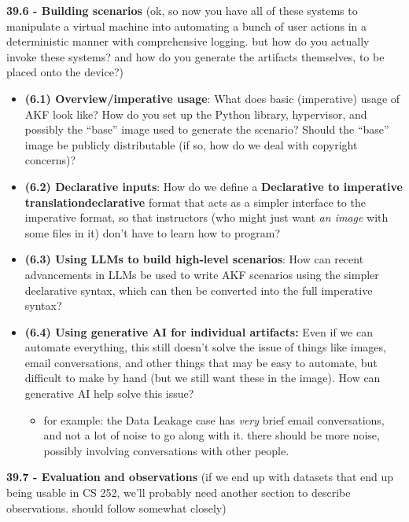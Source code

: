 \textbf{39.6 - Building scenarios} (ok, so now you have all of these
systems to manipulate a virtual machine into automating a bunch of user
actions in a deterministic manner with comprehensive logging. but how do
you actually invoke these systems? and how do you generate the artifacts
themselves, to be placed onto the device?)

\begin{itemize}
\tightlist
\item
  \textbf{(6.1) Overview/imperative usage}: What does basic (imperative)
  usage of AKF look like? How do you set up the Python library,
  hypervisor, and possibly the ``base'' image used to generate the
  scenario? Should the ``base'' image be publicly distributable (if so,
  how do we deal with copyright concerns)?
\item
  \textbf{(6.2) Declarative inputs}: How do we define a
  \textbf{Declarative to imperative translation\textbar declarative}
  format that acts as a simpler interface to the imperative format, so
  that instructors (who might just want \emph{an image} with some files
  in it) don't have to learn how to program?
\item
  \textbf{(6.3) Using LLMs to build high-level scenarios}: How can
  recent advancements in LLMs be used to write AKF scenarios using the
  simpler declarative syntax, which can then be converted into the full
  imperative syntax?
\item
  \textbf{(6.4) Using generative AI for individual artifacts:} Even if
  we can automate everything, this still doesn't solve the issue of
  things like images, email conversations, and other things that may be
  easy to automate, but difficult to make by hand (but we still want
  these in the image). How can generative AI help solve this issue?

  \begin{itemize}
  \tightlist
  \item
    for example: the Data Leakage case has \emph{very} brief email
    conversations, and not a lot of noise to go along with it. there
    should be more noise, possibly involving conversations with other
    people.
  \end{itemize}
\end{itemize}

\textbf{39.7 - Evaluation and observations} (if we end up with datasets
that end up being usable in CS 252, we'll probably need another section
to describe observations. should follow
\cite{mochEvaluatingForensicImage2012} somewhat closely)


